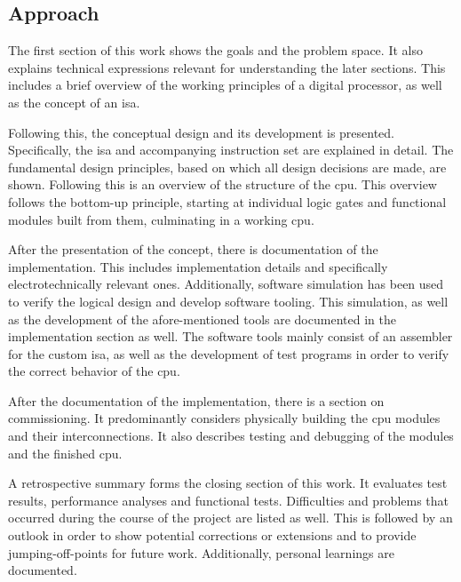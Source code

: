 \subsection{Approach}

The first section of this work shows the goals and the problem space. It also explains technical expressions relevant for understanding the later sections. This includes a brief overview of the working principles of a digital processor, as well as the concept of an \ac{isa}.

Following this, the conceptual design and its development is presented. Specifically, the \ac{isa} and accompanying instruction set are explained in detail. The fundamental design principles, based on which all design decisions are made, are shown. Following this is an overview of the structure of the \ac{cpu}. This overview follows the bottom-up principle, starting at individual logic gates and functional modules built from them, culminating in a working \ac{cpu}.

After the presentation of the concept, there is documentation of the implementation. This includes implementation details and specifically electrotechnically relevant ones. Additionally, software simulation has been used to verify the logical design and develop software tooling. This simulation, as well as the development of the afore-mentioned tools are documented in the implementation section as well. The software tools mainly consist of an assembler for the custom \ac{isa}, as well as the development of test programs in order to verify the correct behavior of the \ac{cpu}.

After the documentation of the implementation, there is a section on commissioning. It predominantly considers physically building the \ac{cpu} modules and their interconnections. It also describes testing and debugging of the modules and the finished \ac{cpu}.

A retrospective summary forms the closing section of this work. It evaluates test results, performance analyses and functional tests. Difficulties and problems that occurred during the course of the project are listed as well. This is followed by an outlook in order to show potential corrections or extensions and to provide jumping-off-points for future work. Additionally, personal learnings are documented.